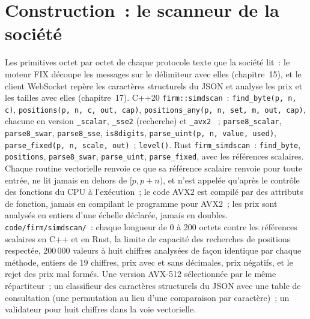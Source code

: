 \section{Construction~: le scanneur de la société}\label{bld:ll:vector-instructions-and-data-parallel-code:simdscan}

\begin{build}
 Les primitives octet par octet de chaque protocole texte que la société lit~: le moteur FIX découpe les messages sur le
délimiteur avec elles (chapitre~15), et le client WebSocket repère les caractères structurels du JSON et analyse les prix et les tailles avec
elles (chapitre~17).
 C++20 \texttt{firm::simdscan}~: \texttt{find\_byte(p, n, c)}, \texttt{positions(p, n, c, out, cap)},
\texttt{positions\_any(p, n, set, m, out, cap)}, chacune en version \texttt{\_scalar}, \texttt{\_sse2} (recherche) et \texttt{\_avx2}
~; \texttt{parse8\_scalar}, \texttt{parse8\_swar}, \texttt{parse8\_sse}, \texttt{is8digits},
\texttt{parse\_uint(p, n, value, used)}, \texttt{parse\_fixed(p, n, scale, out)}~; \texttt{level()}. Rust
\texttt{firm\_simdscan}~: \texttt{find\_byte}, \texttt{positions}, \texttt{parse8\_swar}, \texttt{parse\_uint},
\texttt{parse\_fixed}, avec les références scalaires.
 Chaque routine vectorielle renvoie ce que sa référence scalaire renvoie pour toute entrée, ne lit jamais en dehors de
$[p, p+n)$, et n'est appelée qu'après le contrôle des fonctions du CPU à l'exécution~; le code AVX2 est compilé par des attributs de fonction, jamais en
compilant le programme pour AVX2~; les prix sont analysés en entiers d'une échelle déclarée, jamais en doubles.
 \texttt{code/firm/simdscan/}~: chaque longueur de 0 à 200 octets contre les références scalaires en
C++ et en Rust, la limite de capacité des recherches de positions respectée, 200\,000 valeurs à huit chiffres analysées de façon identique par chaque
méthode, entiers de 19 chiffres, prix avec et sans décimales, prix négatifs, et le rejet des prix mal formés.
 Une version AVX-512 sélectionnée par le même répartiteur~; un classifieur des caractères structurels du JSON avec une
table de consultation (une permutation au lieu d'une comparaison par caractère)~; un validateur pour huit chiffres dans la voie vectorielle.
\end{build}

